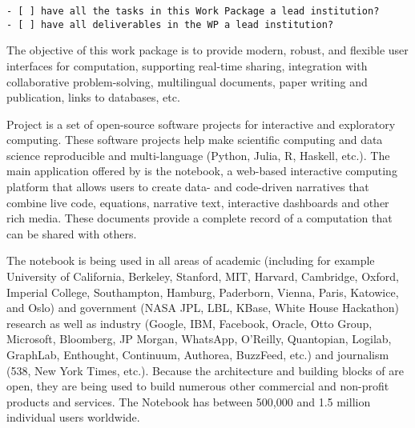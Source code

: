 \begin{draft}
\begin{verbatim}
- [ ] have all the tasks in this Work Package a lead institution?
- [ ] have all deliverables in the WP a lead institution?
\end{verbatim}
\end{draft}


\begin{workpackage}[id=UI,wphases=0-48,
  title=User Interfaces,
  lead=SR,
  PSRM=12, %
  UVRM=2, %
  JURM=22, %
  USHRM=12, %
  LLRM=1, %
  SARM=18, %
  UKRM=1, %
  UBRM=1, %
  USORM=22, %
  SRRM=23]

\begin{wpobjectives}
  The objective of this work package is to provide modern, robust,
  and flexible user interfaces for computation, supporting real-time
  sharing, integration with collaborative problem-solving,
  multilingual documents, paper writing and publication, links to
  databases, etc.
\end{wpobjectives}

\begin{wpdescription}
  Project \Jupyter is a set of open-source software projects for interactive and exploratory
  computing. These software projects help make scientific computing and data science reproducible
  and multi-language (Python, Julia, R, Haskell, etc.). The main application offered by \Jupyter is
  the \Jupyter notebook, a web-based interactive computing platform that allows users to create
  data- and code-driven narratives that combine live code, equations, narrative text, interactive
  dashboards and other rich media. These documents provide a complete record of a computation that
  can be shared with others.

  The \Jupyter notebook is being used in all areas of academic
  (including for example University of California, Berkeley, Stanford,
  MIT, Harvard, Cambridge, Oxford, Imperial College, Southampton,
  Hamburg, Paderborn, Vienna, Paris, Katowice, and Oslo) and
  government (NASA JPL, LBL, KBase, White House Hackathon) research as
  well as industry (Google, IBM, Facebook, Oracle, Otto Group,
  Microsoft, Bloomberg, JP Morgan, WhatsApp, O’Reilly, Quantopian,
  Logilab, GraphLab, Enthought, Continuum, Authorea, BuzzFeed, etc.)
  and journalism (538, New York Times, etc.). Because the architecture
  and building blocks of \Jupyter are open, they are being used to
  build numerous other commercial and non-profit products and
  services. The \Jupyter Notebook has between 500,000 and 1.5 million
  individual users worldwide.


\end{wpdescription}
\end{workpackage}
